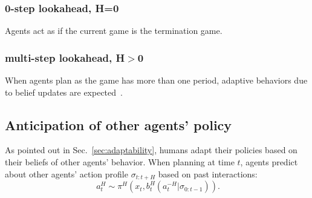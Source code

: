 \documentclass[letterpaper, 10 pt, conference]{ieeeconf}  %
\begin{document}
\subsubsection{0-step lookahead, H=0}
Agents act as if the current game is the termination game. 

\subsubsection{multi-step lookahead, H$>$0}
When agents plan as the game has more than one period, adaptive behaviors due 
to belief updates are expected~\cite{nikolaidis2016formalizing}.




\vspace{-.2em}
\subsection{Anticipation of other agents' policy}
\vspace{-.2em}
As pointed out in Sec.~\ref{sec:adaptability}, humans adapt their policies 
based on their beliefs of other agents' behavior.
When planning at time $t$, agents predict about other agents' 
action profile $\sigma_{t:t+H}$ based on past interactions:
\begin{equation}~\label{eq:human_decision1}
a^H_t \sim \pi^H(x_t, b^H_t(a^{-H}_{t}|\sigma_{0:t-1})).
\end{equation}
\end{document}
